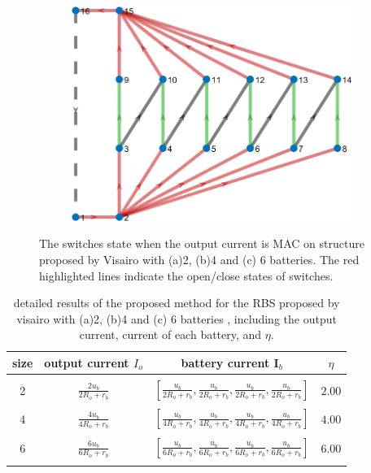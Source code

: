 \documentclass{article}
\begin{document}
\begin{figure}[htbp]
    \begin{subfigure}[b]{0.45\textwidth}
        \includegraphics[width=\textwidth]{../attachments/f-dege-mac-6.png}
        \caption{}
        \label{fig:d-size-6}
    \end{subfigure}
    \caption{
        The switches state when the output current is MAC on structure proposed by Visairo\cite{visairoReconfigurableBatteryPack2008} with (a)2, (b)4 and (c) 6 batteries.  
        The red highlighted lines indicate the open/close states of switches.
        }
    \label{fig:d-size}
\end{figure}

\begin{table}[h]
    \caption{detailed results of the proposed method for the RBS proposed by visairo\cite{visairoReconfigurableBatteryPack2008} with (a)2, (b)4 and (c) 6 batteries , including the output current, current of each battery, and $\eta$.}
    \label{tab:d-size}
    \begin{tabular}{cccc}
        \hline
        size &  output current $I_o$       & battery current $\bm{I}_b$       & $\eta$        \\
        \hline\\
        2 &  $\displaystyle\frac{2u_b}{2R_o + r_b}$ &  $\displaystyle\left[\frac{u_b}{2R_o + r_b},\frac{u_b}{2R_o + r_b},\frac{u_b}{2R_o + r_b},\frac{u_b}{2R_o + r_b}\right]$   & $2.00$ \\
        \\
        4 &  $\displaystyle\frac{4u_b}{4R_o + r_b}$ &  $\displaystyle\left[\frac{u_b}{4R_o + r_b},\frac{u_b}{4R_o + r_b},\frac{u_b}{4R_o + r_b},\frac{u_b}{4R_o + r_b}\right]$   & $4.00$ \\
        \\
        6 &  $\displaystyle\frac{6u_b}{6R_o + r_b}$ &  $\displaystyle\left[\frac{u_b}{6R_o + r_b},\frac{u_b}{6R_o + r_b},\frac{u_b}{6R_o + r_b},\frac{u_b}{6R_o + r_b}\right]$   & $6.00$ \\
        \\
        \hline
    \end{tabular}
\end{table}
\end{document}

